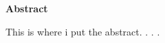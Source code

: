 \thispagestyle{plain}
\begin{center}
    \large
    \textbf{Abstract}
\end{center}

This is where i put the abstract. . . .